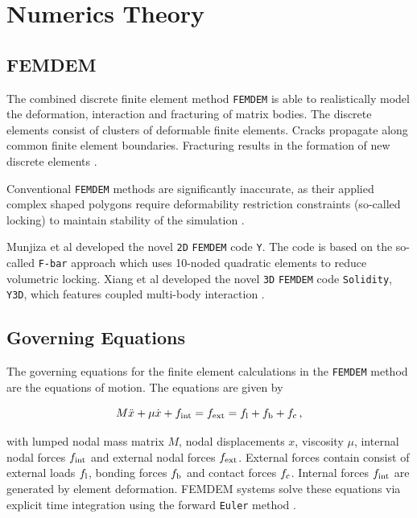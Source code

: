 \documentclass[12pt,twoside]{article}
\theoremstyle{break}
\begin{document}
\section{Numerics Theory}

\subsection{FEMDEM}
The combined discrete finite element method \texttt{FEMDEM} \cite{Wan18, Mun95, Mun99, Mun04, Mun12, Mun13, Guo16, Gao14, Xu14, Che18} is able to realistically model the deformation, interaction and fracturing of matrix bodies. The discrete elements consist of clusters of deformable finite elements. Cracks propagate along common finite element boundaries. Fracturing results in the formation of new discrete elements \cite{Mun13}. 

\bigbreak
Conventional \texttt{FEMDEM} methods are significantly inaccurate, as their applied complex shaped polygons require deformability restriction constraints (so-called locking) to maintain stability of the simulation \cite{Lat15}. 

\bigbreak
Munjiza et al \cite{Mun13} developed the novel \texttt{2D} \texttt{FEMDEM} code \texttt{Y}. The code is based on the so-called \texttt{F-bar} approach which uses 10-noded quadratic elements to reduce volumetric locking. Xiang et al \cite{Xia09} developed the novel \texttt{3D} \texttt{FEMDEM} code \texttt{Solidity}, \texttt{Y3D}, which features coupled multi-body interaction \cite{Lat15}.

\subsection{Governing Equations}
The governing equations for the finite element calculations in the \texttt{FEMDEM} method are the equations of motion. The equations are given by

\begin{equation}
    M\ddot{x}+\mu\dot{x}+f_{\rm{int}}=f_{\rm{ext}}=f_{\rm{l}}+f_{\rm{b}}+f_{\rm{c}}\,,
\end{equation}

with lumped nodal mass matrix $M$, nodal displacements $x$, viscosity $\mu$, internal nodal forces $f_{\rm{int}}$ and external nodal forces $f_{\rm{ext}}$. External forces contain consist of external loads $f_{\rm{l}}$, bonding forces $f_{\rm{b}}$ and contact forces $f_{\rm{c}}$. Internal forces $f_{\rm{int}}$ are generated by element deformation. FEMDEM systems solve these equations via explicit time integration using the forward \texttt{Euler} method \cite{Lei16}.
\end{document}
